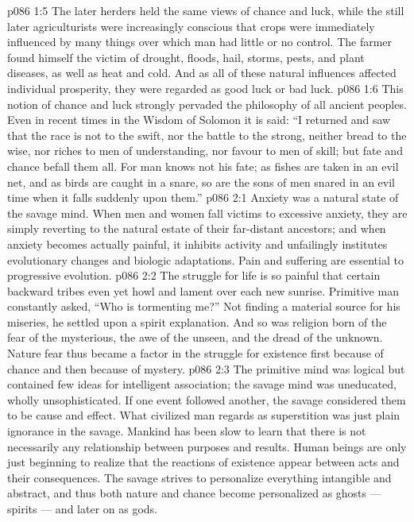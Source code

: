 \vs p086 1:5 The later herders held the same views of chance and luck, while the still later agriculturists were increasingly conscious that crops were immediately influenced by many things over which man had little or no control. The farmer found himself the victim of drought, floods, hail, storms, pests, and plant diseases, as well as heat and cold. And as all of these natural influences affected individual prosperity, they were regarded as good luck or bad luck.
\vs p086 1:6 This notion of chance and luck strongly pervaded the philosophy of all ancient peoples. Even in recent times in the Wisdom of Solomon it is said: “I returned and saw that the race is not to the swift, nor the battle to the strong, neither bread to the wise, nor riches to men of understanding, nor favour to men of skill; but fate and chance befall them all. For man knows not his fate; as fishes are taken in an evil net, and as birds are caught in a snare, so are the sons of men snared in an evil time when it falls suddenly upon them.”
\vs p086 2:1 Anxiety was a natural state of the savage mind. When men and women fall victims to excessive anxiety, they are simply reverting to the natural estate of their far\hyp{}distant ancestors; and when anxiety becomes actually painful, it inhibits activity and unfailingly institutes evolutionary changes and biologic adaptations. Pain and suffering are essential to progressive evolution.
\vs p086 2:2 The struggle for life is so painful that certain backward tribes even yet howl and lament over each new sunrise. Primitive man constantly asked, “Who is tormenting me?” Not finding a material source for his miseries, he settled upon a spirit explanation. And so was religion born of the fear of the mysterious, the awe of the unseen, and the dread of the unknown. Nature fear thus became a factor in the struggle for existence first because of chance and then because of mystery.
\vs p086 2:3 \pc The primitive mind was logical but contained few ideas for intelligent association; the savage mind was uneducated, wholly unsophisticated. If one event followed another, the savage considered them to be cause and effect. What civilized man regards as superstition was just plain ignorance in the savage. Mankind has been slow to learn that there is not necessarily any relationship between purposes and results. Human beings are only just beginning to realize that the reactions of existence appear between acts and their consequences. The savage strives to personalize everything intangible and abstract, and thus both nature and chance become personalized as ghosts --- spirits --- and later on as gods.
